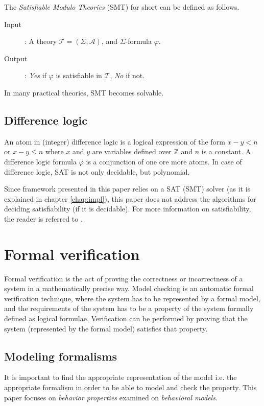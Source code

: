 The \emph{Satisfiable Modulo Theories} (SMT) for short can be defined as follows.
\begin{description}
	\item[Input]: A theory $\mathcal{T}=(\Sigma,\mathcal{A})$, and $\Sigma$-formula $\varphi$.
	\item[Output]: \emph{Yes} if $\varphi$ is satisfiable in $\mathcal{T}$, \emph{No} if not.
\end{description}

In many practical theories, SMT becomes solvable.

\subsection{Difference logic}

An atom in (integer) difference logic is a logical expression of the form $x-y<n$ or $x-y \leq n$ where $x$ and $y$ are variables defined over $\mathds{Z}$ and $n$ is a constant. A difference logic formula $\varphi$ is a conjunction of one ore more atoms. In case of difference logic, SAT is not only decidable, but polynomial.

Since framework presented in this paper relies on a SAT (SMT) solver (as it is explained in chapter \ref{chap:impl}), this paper does not address the algorithms for deciding satisfiability (if it is decidable). For more information on satisfiability, the reader is referred to \cite{books/daglib/0019162}.


\section{Formal verification}

Formal verification is the act of proving the correctness or incorrectness of a system in a mathematically precise way. Model checking is an automatic formal verification technique, where the system has to be represented by a formal model, and the requirements of the system has to be a property of the system formally defined as logical formulae. Verification can be performed by proving that the system (represented by the formal model) satisfies that property.

\subsection{Modeling formalisms}
It is important to find the appropriate representation of the model i.e. the appropriate formalism in order to be able to model and check the property. This paper focuses on \emph{behavior properties} examined on \emph{behavioral models}.

